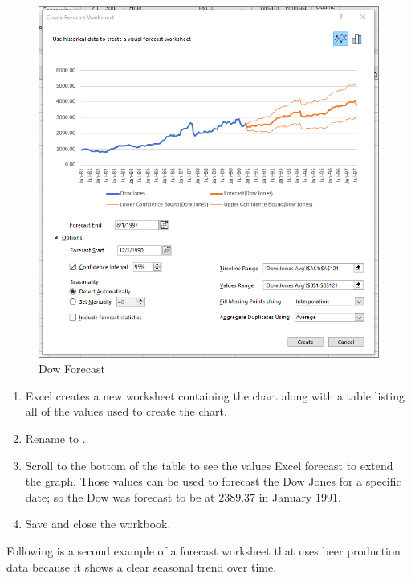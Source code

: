\begin{figure}[H]
	\centering
	\includegraphics[width=\maxwidth{.95\linewidth}]{gfx/ch08_fig12}
	\caption{Dow Forecast}
	\label{08:fig12}
\end{figure}

\begin{enumerate}[resume]
	\item Excel creates a new worksheet containing the chart along with a table listing all of the values used to create the chart.
	\item Rename  to .
	\item Scroll to the bottom of the table to see the values Excel forecast to extend the graph. Those values can be used to forecast the Dow Jones for a specific date; so the Dow was forecast to be at $ 2389.37 $ in January $ 1991 $.
	\item Save and close the  workbook.
\end{enumerate}

Following is a second example of a forecast worksheet that uses beer production data because it shows a clear seasonal trend over time.

